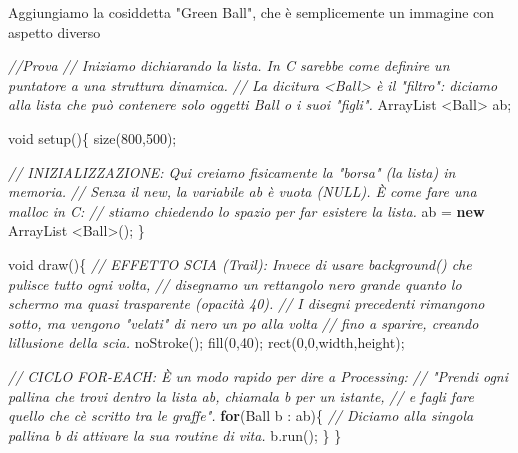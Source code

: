 \documentclass[
]{article}
\newenvironment{Shaded}{}{}
\newcommand{\BuiltInTok}[1]{\textcolor[rgb]{0.00,0.50,0.00}{#1}}
\newcommand{\CommentTok}[1]{\textcolor[rgb]{0.38,0.63,0.69}{\textit{#1}}}
\newcommand{\ControlFlowTok}[1]{\textcolor[rgb]{0.00,0.44,0.13}{\textbf{#1}}}
\newcommand{\DataTypeTok}[1]{\textcolor[rgb]{0.56,0.13,0.00}{#1}}
\newcommand{\DecValTok}[1]{\textcolor[rgb]{0.25,0.63,0.44}{#1}}
\newcommand{\FunctionTok}[1]{\textcolor[rgb]{0.02,0.16,0.49}{#1}}
\newcommand{\KeywordTok}[1]{\textcolor[rgb]{0.00,0.44,0.13}{\textbf{#1}}}
\newcommand{\NormalTok}[1]{#1}
\newcommand{\OperatorTok}[1]{\textcolor[rgb]{0.40,0.40,0.40}{#1}}
\begin{document}
Aggiungiamo la cosiddetta "Green Ball", che è semplicemente un immagine
con aspetto diverso

\begin{Shaded}
\begin{Highlighting}[]
\CommentTok{//Prova}
\CommentTok{// Iniziamo dichiarando la lista. In C sarebbe come definire un puntatore a una struttura dinamica.}
\CommentTok{// La dicitura \textless{}Ball\textgreater{} è il "filtro": diciamo alla lista che può contenere solo oggetti Ball o i suoi "figli".}
\BuiltInTok{ArrayList} \OperatorTok{\textless{}}\NormalTok{Ball}\OperatorTok{\textgreater{}}\NormalTok{ ab}\OperatorTok{;}

\DataTypeTok{void} \FunctionTok{setup}\OperatorTok{()\{}
  \FunctionTok{size}\OperatorTok{(}\DecValTok{800}\OperatorTok{,}\DecValTok{500}\OperatorTok{);}
  
  \CommentTok{// INIZIALIZZAZIONE: Qui creiamo fisicamente la "borsa" (la lista) in memoria.}
  \CommentTok{// Senza il \textquotesingle{}new\textquotesingle{}, la variabile \textquotesingle{}ab\textquotesingle{} è vuota (NULL). È come fare una malloc in C: }
  \CommentTok{// stiamo chiedendo lo spazio per far esistere la lista.}
\NormalTok{  ab }\OperatorTok{=} \KeywordTok{new} \BuiltInTok{ArrayList} \OperatorTok{\textless{}}\NormalTok{Ball}\OperatorTok{\textgreater{}();} 
\OperatorTok{\}}

\DataTypeTok{void} \FunctionTok{draw}\OperatorTok{()\{}
  \CommentTok{// EFFETTO SCIA (Trail): Invece di usare background() che pulisce tutto ogni volta, }
  \CommentTok{// disegnamo un rettangolo nero grande quanto lo schermo ma quasi trasparente (opacità 40).}
  \CommentTok{// I disegni precedenti rimangono sotto, ma vengono "velati" di nero un po\textquotesingle{} alla volta }
  \CommentTok{// fino a sparire, creando l\textquotesingle{}illusione della scia.}
  \FunctionTok{noStroke}\OperatorTok{();}
  \FunctionTok{fill}\OperatorTok{(}\DecValTok{0}\OperatorTok{,}\DecValTok{40}\OperatorTok{);}
  \FunctionTok{rect}\OperatorTok{(}\DecValTok{0}\OperatorTok{,}\DecValTok{0}\OperatorTok{,}\NormalTok{width}\OperatorTok{,}\NormalTok{height}\OperatorTok{);}

  \CommentTok{// CICLO FOR{-}EACH: È un modo rapido per dire a Processing:}
  \CommentTok{// "Prendi ogni pallina che trovi dentro la lista \textquotesingle{}ab\textquotesingle{}, chiamala \textquotesingle{}b\textquotesingle{} per un istante, }
  \CommentTok{// e fagli fare quello che c\textquotesingle{}è scritto tra le graffe".}
  \ControlFlowTok{for}\OperatorTok{(}\NormalTok{Ball b }\OperatorTok{:}\NormalTok{ ab}\OperatorTok{)\{}
    \CommentTok{// Diciamo alla singola pallina \textquotesingle{}b\textquotesingle{} di attivare la sua routine di vita.}
\NormalTok{    b}\OperatorTok{.}\FunctionTok{run}\OperatorTok{();}
  \OperatorTok{\}}
\OperatorTok{\}}


\end{Highlighting}
\end{Shaded}
\end{document}
